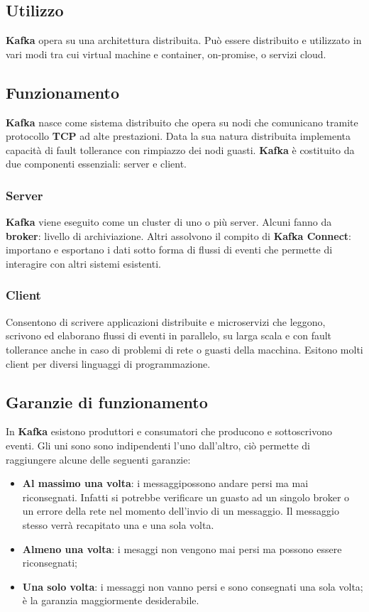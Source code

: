 \documentclass{article}
\begin{document}
\subsection{Utilizzo}
\textbf{Kafka} opera su una architettura distribuita. Può essere distribuito e utilizzato in vari modi tra cui virtual machine e container, on-promise, o servizi cloud.

\subsection{Funzionamento}
\textbf{Kafka} nasce come sistema distribuito che opera su nodi che comunicano tramite protocollo \textbf{TCP} ad alte prestazioni. Data la sua natura distribuita implementa capacità di fault tollerance con rimpiazzo dei nodi guasti. 
\textbf{Kafka} è costituito da due componenti essenziali: server e client.
\subsubsection{Server}
\textbf{Kafka} viene eseguito come un cluster di uno o più server. Alcuni fanno da \textbf{broker}: livello di archiviazione. Altri assolvono il compito di \textbf{\textbf{Kafka} Connect}: importano e esportano i dati sotto forma di  flussi di eventi che permette di interagire con altri sistemi esistenti.
\subsubsection{Client}
Consentono di scrivere applicazioni distribuite e microservizi che leggono, scrivono ed elaborano flussi di eventi in parallelo, su larga scala e con fault tollerance anche in caso di problemi di rete o guasti della macchina.
Esitono molti client per diversi linguaggi di programmazione.
\subsection{Garanzie di funzionamento}
In \textbf{Kafka} esistono produttori e consumatori che producono e sottoscrivono eventi. 
Gli uni sono sono indipendenti l'uno dall'altro, ciò permette di raggiungere alcune delle seguenti garanzie:
\begin{itemize}
    \item \textbf{Al massimo una volta}: i messaggipossono andare persi ma mai riconsegnati. Infatti si potrebbe verificare un guasto ad un singolo broker o un errore della rete nel momento dell'invio di un messaggio. Il messaggio stesso verrà recapitato una e una sola volta.
    \item \textbf{Almeno una volta}: i mesaggi non 		vengono mai persi ma possono essere 		riconsegnati;
    \item \textbf{Una solo volta}: i messaggi non  		vanno persi e sono consegnati una 		sola volta; è la garanzia maggiormente desiderabile.
\end{itemize}
\end{document}
